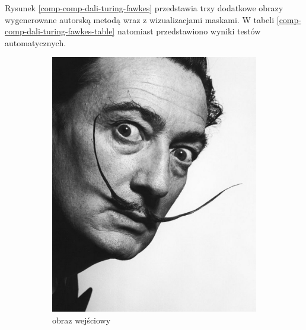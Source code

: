 \documentclass[a4paper, 12pt, polish, twoside]{extreport}
\begin{document}
	Rysunek \ref{comp-comp-dali-turing-fawkes} przedstawia trzy dodatkowe obrazy wygenerowane autorską metodą wraz z wizualizacjami maskami. W tabeli \ref{comp-comp-dali-turing-fawkes-table} natomiast przedstawiono wyniki testów automatycznych.
	\begin{figure}[H] 
    \centering
    \begin{subfigure}{0.24\textwidth}
        \centering
        \includegraphics[width = \textwidth]{img/6-comp/dali_original_c10_inv0.png}
        \caption{obraz wejściowy}
        \label{comp-comp-dali-turing-fawkes-a}
    \end{subfigure}
    \begin{subfigure}{0.24\textwidth}
        \centering

\end{subfigure}
\end{figure}
\end{document}
